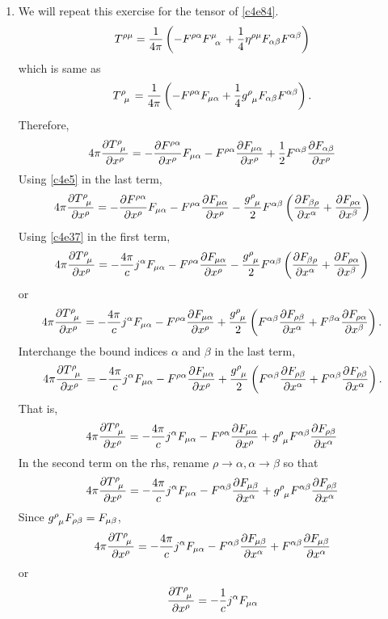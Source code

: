 \begin{enumerate}
\item We will repeat this exercise for the tensor of \eqref{c4e84}.
\[
T^{\rho\mu} = \frac{1}{4\pi}\left(-F^{\rho\alpha}\tensor{F}{^\mu_\alpha} +
\frac{1}{4}\eta^{\rho\mu}F_{\alpha\beta}F^{\alpha\beta}\right)
\]
which is same as
\[
\tensor{T}{^\rho_\mu} = \frac{1}{4\pi}\left(-F^{\rho\alpha}F_{\mu\alpha} +
\frac{1}{4}\tensor{g}{^\rho_\mu}F_{\alpha\beta}F^{\alpha\beta}\right).
\]
Therefore,
\[
4\pi\pdt{\tensor{T}{^\rho_\mu}}{x^\rho} = -\pdt{F^{\rho\alpha}}{x^\rho}
F_{\mu\alpha} - F^{\rho\alpha}\pdt{F_{\mu\alpha}}{x^\rho} + 
\frac{1}{2}F^{\alpha\beta}\pdt{F_{\alpha\beta}}{x^\rho}
\]
Using \eqref{c4e5} in the last term,
\[
4\pi\pdt{\tensor{T}{^\rho_\mu}}{x^\rho} = -\pdt{F^{\rho\alpha}}{x^\rho}
F_{\mu\alpha}
- F^{\rho\alpha}\pdt{F_{\mu\alpha}}{x^\rho} - \frac{\tensor{g}{^\rho_\mu}}{2}
 F^{\alpha\beta}
 \left(\pdt{F_{\beta\rho}}{x^\alpha} + \pdt{F_{\rho\alpha}}{x^\beta}\right)
\]
Using \eqref{c4e37} in the first term,
\[
4\pi\pdt{\tensor{T}{^\rho_\mu}}{x^\rho} = -\frac{4\pi}{c}j^\alpha F_{\mu\alpha}
- F^{\rho\alpha}\pdt{F_{\mu\alpha}}{x^\rho} - \frac{\tensor{g}{^\rho_\mu}}{2}
F^{\alpha\beta}
\left(\pdt{F_{\beta\rho}}{x^\alpha} + \pdt{F_{\rho\alpha}}{x^\beta}\right)
\]
or
\[
4\pi\pdt{\tensor{T}{^\rho_\mu}}{x^\rho} = -\frac{4\pi}{c}j^\alpha F_{\mu\alpha}
- F^{\rho\alpha}\pdt{F_{\mu\alpha}}{x^\rho} + \frac{\tensor{g}{^\rho_\mu}}{2}
\left(F^{\alpha\beta}\pdt{F_{\rho\beta}}{x^\alpha} + F^{\beta\alpha}
\pdt{F_{\rho\alpha}}{x^\beta}\right).
\]
Interchange the bound indices $\alpha$ and $\beta$ in the last term,
\[
4\pi\pdt{\tensor{T}{^\rho_\mu}}{x^\rho} = -\frac{4\pi}{c}j^\alpha F_{\mu\alpha}
- F^{\rho\alpha}\pdt{F_{\mu\alpha}}{x^\rho} + \frac{\tensor{g}{^\rho_\mu}}{2}
\left(F^{\alpha\beta}\pdt{F_{\rho\beta}}{x^\alpha} + 
F^{\alpha\beta}\pdt{F_{\rho\beta}}{x^\alpha}\right).
\]
That is,
\[
4\pi\pdt{\tensor{T}{^\rho_\mu}}{x^\rho} = -\frac{4\pi}{c}j^\alpha F_{\mu\alpha}
- F^{\rho\alpha}\pdt{F_{\mu\alpha}}{x^\rho} + \tensor{g}{^\rho_\mu}
F^{\alpha\beta}\pdt{F_{\rho\beta}}{x^\alpha}
\]
In the second term on the rhs, rename $\rho \rightarrow \alpha, \alpha 
\rightarrow \beta$ so that
\[
4\pi\pdt{\tensor{T}{^\rho_\mu}}{x^\rho} = -\frac{4\pi}{c}j^\alpha F_{\mu\alpha}
- F^{\alpha\beta}\pdt{F_{\mu\beta}}{x^\alpha} + \tensor{g}{^\rho_\mu}
F^{\alpha\beta}\pdt{F_{\rho\beta}}{x^\alpha}
\]
Since $\tensor{g}{^\rho_\mu} F_{\rho\beta} = F_{\mu\beta}$,
\[
4\pi\pdt{\tensor{T}{^\rho_\mu}}{x^\rho} = -\frac{4\pi}{c}j^\alpha F_{\mu\alpha}
- F^{\alpha\beta}\pdt{F_{\mu\beta}}{x^\alpha} + F^{\alpha\beta}
\pdt{F_{\mu\beta}}{x^\alpha}
\]
or
\begin{equation}\label{c4e98}
\pdt{\tensor{T}{^\rho_\mu}}{x^\rho} = -\frac{1}{c}j^\alpha F_{\mu\alpha}
\end{equation}


\end{enumerate}
